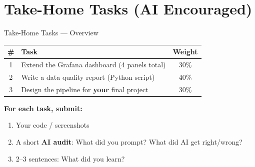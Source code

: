 \documentclass[aspectratio=169,11pt]{beamer}
\begin{document}
\section{Take-Home Tasks (AI Encouraged)}

\begin{frame}{Take-Home Tasks --- Overview}

    \vspace{0.3cm}
    \begin{center}
    \begin{tabular}{clc}
        \toprule
        \textbf{\#} & \textbf{Task} & \textbf{Weight} \\
        \midrule
        1 & Extend the Grafana dashboard (4 panels total) & 30\% \\
        2 & Write a data quality report (Python script) & 40\% \\
        3 & Design the pipeline for \textbf{your} final project & 30\% \\
        \bottomrule
    \end{tabular}
    \end{center}

    \vspace{0.3cm}
    \textbf{For each task, submit:}
    \begin{enumerate}
        \item Your code / screenshots
        \item A short \textbf{AI audit}: What did you prompt? What did AI get right/wrong?
        \item 2--3 sentences: What did you learn?
    \end{enumerate}
\end{frame}
\end{document}
